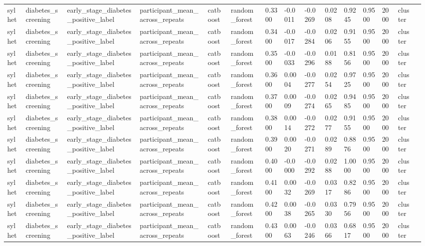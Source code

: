 \begin{tabular}{lllllllllllllll}
sylhet & diabetes\_screening & early\_stage\_diabetes\_positive\_label & participant\_mean\_across\_repeats & catboost & random\_forest & 0.3300 & -0.0011 & -0.0269 & 0.0208 & 0.9245 & 0.9500 & 2000 & cluster &  \\
sylhet & diabetes\_screening & early\_stage\_diabetes\_positive\_label & participant\_mean\_across\_repeats & catboost & random\_forest & 0.3400 & -0.0017 & -0.0284 & 0.0206 & 0.9155 & 0.9500 & 2000 & cluster &  \\
sylhet & diabetes\_screening & early\_stage\_diabetes\_positive\_label & participant\_mean\_across\_repeats & catboost & random\_forest & 0.3500 & -0.0033 & -0.0296 & 0.0188 & 0.8156 & 0.9500 & 2000 & cluster &  \\
sylhet & diabetes\_screening & early\_stage\_diabetes\_positive\_label & participant\_mean\_across\_repeats & catboost & random\_forest & 0.3600 & 0.0004 & -0.0277 & 0.0254 & 0.9725 & 0.9500 & 2000 & cluster &  \\
sylhet & diabetes\_screening & early\_stage\_diabetes\_positive\_label & participant\_mean\_across\_repeats & catboost & random\_forest & 0.3700 & 0.0009 & -0.0274 & 0.0265 & 0.9485 & 0.9500 & 2000 & cluster &  \\
sylhet & diabetes\_screening & early\_stage\_diabetes\_positive\_label & participant\_mean\_across\_repeats & catboost & random\_forest & 0.3800 & 0.0014 & -0.0272 & 0.0277 & 0.9155 & 0.9500 & 2000 & cluster &  \\
sylhet & diabetes\_screening & early\_stage\_diabetes\_positive\_label & participant\_mean\_across\_repeats & catboost & random\_forest & 0.3900 & 0.0020 & -0.0271 & 0.0289 & 0.8876 & 0.9500 & 2000 & cluster &  \\
sylhet & diabetes\_screening & early\_stage\_diabetes\_positive\_label & participant\_mean\_across\_repeats & catboost & random\_forest & 0.4000 & -0.0000 & -0.0292 & 0.0288 & 1.0000 & 0.9500 & 2000 & cluster &  \\
sylhet & diabetes\_screening & early\_stage\_diabetes\_positive\_label & participant\_mean\_across\_repeats & catboost & random\_forest & 0.4100 & 0.0032 & -0.0269 & 0.0317 & 0.8286 & 0.9500 & 2000 & cluster &  \\
sylhet & diabetes\_screening & early\_stage\_diabetes\_positive\_label & participant\_mean\_across\_repeats & catboost & random\_forest & 0.4200 & 0.0038 & -0.0265 & 0.0330 & 0.7956 & 0.9500 & 2000 & cluster &  \\
sylhet & diabetes\_screening & early\_stage\_diabetes\_positive\_label & participant\_mean\_across\_repeats & catboost & random\_forest & 0.4300 & 0.0063 & -0.0246 & 0.0366 & 0.6817 & 0.9500 & 2000 & cluster &  \\

\end{tabular}
